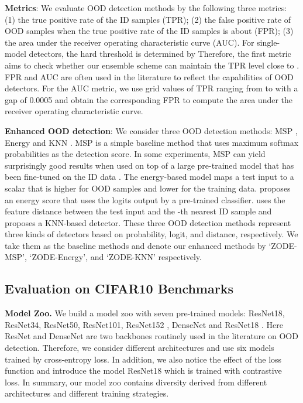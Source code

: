 \documentclass{article} \usepackage{iclr2023_conference,times}
\begin{document}
\textbf{Metrics}: We evaluate OOD detection methods by the following three metrics: (1) the true positive rate of the ID samples (TPR); (2) the false positive rate of OOD samples when the true positive rate of the ID samples is about  (FPR); (3) the area under the receiver operating characteristic curve (AUC). For single-model detectors, the hard threshold is determined by  Therefore, the first metric aims to check whether our ensemble scheme can maintain the TPR level close to . FPR and AUC are often used in the literature to reflect the capabilities of OOD detectors. 
For the AUC metric, we use grid values of TPR ranging from  to  with a gap of 0.0005 and obtain the corresponding FPR to compute the area under the receiver operating characteristic curve. 


\textbf{Enhanced OOD detection}: We consider three OOD detection methods: MSP \citep{hendrycks17baseline}, Energy \citep{liu2020energy} and KNN \citep{sun2022knn}.
MSP is a simple baseline method that uses maximum softmax probabilities as the detection score. 
In some experiments, MSP can yield surprisingly good results when used on top of a large pre-trained model that has been fine-tuned on the ID data \citep{fort2021exploring}.
The energy-based model \citep{lecun2006} maps a test input to a scalar that is higher for OOD samples and lower for the training data. \cite{liu2020energy} proposes an energy score that uses the logits output by a pre-trained classifier.
\cite{sun2022knn} uses the feature distance between the test input and the -th nearest ID sample and proposes a KNN-based detector. 
These three OOD detection methods represent three kinds of detectors based on probability, logit, and distance, respectively.
We take them as the baseline methods and denote our enhanced methods by `ZODE-MSP', `ZODE-Energy', and `ZODE-KNN' respectively.


\subsection{Evaluation on CIFAR10 Benchmarks}

{\bf Model Zoo.} We build a model zoo with seven pre-trained models: ResNet18, ResNet34, ResNet50, ResNet101, ResNet152 \citep{he2016deep}, DenseNet \citep{huang2017densely} and ResNet18 \citep{sun2022knn}.
Here ResNet and DenseNet are two backbones routinely used in the literature on OOD detection. Therefore, we consider different architectures and use six models trained by cross-entropy loss. In addition, we also notice the effect of the loss function and introduce the model ResNet18 which is trained with contrastive loss.
In summary, our model zoo contains diversity derived from different architectures and different training strategies.
\end{document}
